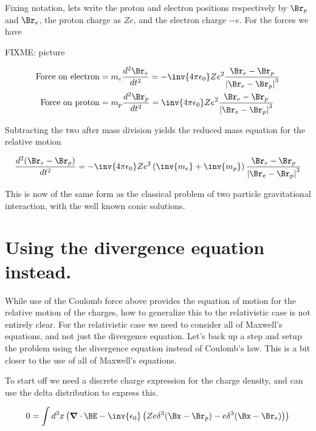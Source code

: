 Fixing notation, lets write the proton and electron positions respectively by $\Br_p$ and $\Br_e$, the proton charge as $Z e$, and the electron charge $-e$.  For the forces we have

FIXME: picture

\begin{align}\label{eqn:nuclearInteraction:hoo1}
\text{Force on electron} &= m_e \frac{d^2 \Br_e}{dt^2} = - \inv{4 \pi \epsilon_0} Z e^2 \frac{\Br_e - \Br_p}{\Abs{\Br_e - \Br_p}^3} \\
\text{Force on proton} &= m_p \frac{d^2 \Br_p}{dt^2} = \inv{4 \pi \epsilon_0} Z e^2 \frac{\Br_e - \Br_p}{\Abs{\Br_e - \Br_p}^3}
\end{align}

Subtracting the two after mass division yields the reduced mass equation for the relative motion

\begin{align}\label{eqn:nuclearInteraction:hoo2}
\frac{d^2 (\Br_e -\Br_p)}{dt^2} = - \inv{4 \pi \epsilon_0} Z e^2 \left( \inv{m_e} + \inv{m_p}\right) \frac{\Br_e - \Br_p}{\Abs{\Br_e - \Br_p}^3} 
\end{align}

This is now of the same form as the classical problem of two particle gravitational interaction, with the well known conic solutions.

\section{Using the divergence equation instead.}

While use of the Coulomb force above provides the equation of motion for the relative motion of the charges, how to generalize this to the relativistic case is not entirely clear.  For the relativistic case we need to consider all of Maxwell's equations, and not just the divergence equation.  Let's back up a step and setup the problem using the divergence equation instead of Coulomb's law.  This is a bit closer to the use of all of Maxwell's equations.

To start off we need a discrete charge expression for the charge density, and can use the delta distribution to express this.

\begin{align}\label{eqn:nuclearInteraction:boo2}
0 = \int d^3 x \left( \spacegrad \cdot \BE - \inv{\epsilon_0} \left( Z e \delta^3(\Bx - \Br_p) - e \delta^3(\Bx - \Br_e) \right) \right)
\end{align}

